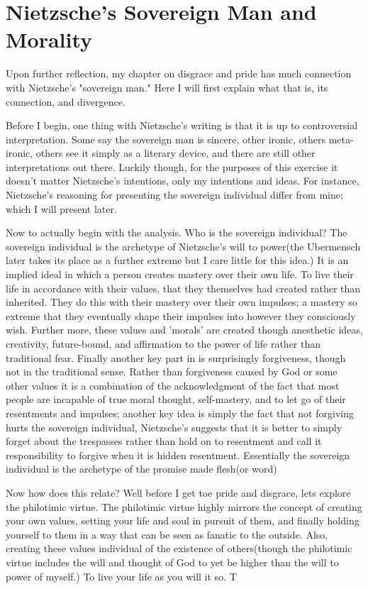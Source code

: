 \section{Nietzsche's Sovereign Man and Morality}
\par Upon further reflection, my chapter on disgrace and pride has much connection with Nietzsche's "sovereign man." Here I will first explain what that is, its connection, and divergence. 
\par Before I begin, one thing with Nietzsche's writing is that it is up to controversial interpretation. Some say the sovereign man is sincere, other ironic, others meta-ironic, others see it simply as a literary device, and there are still other interpretations out there. Luckily though, for the purposes of this exercise it doesn't matter Nietzsche's intentions, only my intentions and ideas. For instance, Nietzsche's reasoning for presenting the sovereign individual differ from mine; which I will present later.
\par Now to actually begin with the analysis. Who is the sovereign individual? The sovereign individual is the archetype of Nietzsche's will to power(the Ubermensch later takes its place as a further extreme but I care little for this idea.) It is an implied ideal in which a person creates mastery over their own life. To live their life in accordance with their values, that they themselves had created rather than inherited. They do this with their mastery over their own impulses; a mastery so extreme that they eventually shape their impulses into however they consciously wish. Further more, these values and 'morals' are created though anesthetic ideas, creativity, future-bound, and affirmation to the power of life rather than traditional fear. Finally another key part in is surprisingly forgiveness, though not in the traditional sense. Rather than forgiveness caused by God or some other values it is a combination of the acknowledgment of the fact that most people are incapable of true moral thought, self-mastery, and to let go of their resentments and impulses; another key idea is simply the fact that not forgiving hurts the sovereign individual, Nietzsche's suggests that it is better to simply forget about the trespasses rather than hold on to resentment and call it responsibility to forgive when it is hidden resentment. Essentially the sovereign individual is the archetype of the promise made flesh(or word)
\par Now how does this relate? Well before I get toe pride and disgrace, lets explore the philotimic virtue. The philotimic virtue highly mirrors the concept of creating your own values, setting your life and soul in pursuit of them, and finally holding yourself to them in a way that can be seen as fanatic to the outside. Also, creating these values individual of the existence of others(though the philotimic virtue includes the will and thought of God to yet be higher than the will to power of myself.) To live your life as you will it so. T
